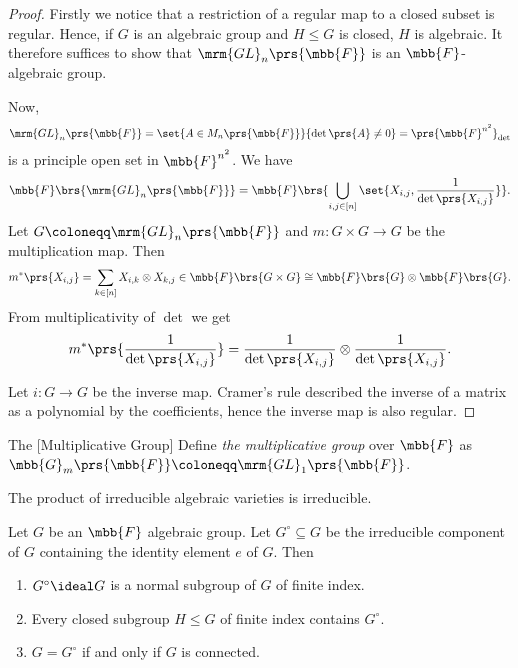 \documentclass[10pt,a4paper,twoside,openany,hidelinks]{book}
\begin{document}
\begin{proof}
Firstly we notice that a restriction of a regular map to a closed subset is regular. Hence, if $G$ is an algebraic group and $H \leq G$ is closed, $H$ is algebraic.
It therefore suffices to show that $\mrm{GL}_n\prs{\mbb{F}}$ is an $\mbb{F}$-algebraic group.

Now, \[\mrm{GL}_n\prs{\mbb{F}} = \set{A \in M_n\prs{\mbb{F}}}{\det\prs{A} \neq 0} = \prs{\mbb{F}^{n^2}}_{\det}\]
is a principle open set in $\mbb{F}^{n^2}$. We have
\begin{align*}
\mbb{F}\brs{\mrm{GL}_n\prs{\mbb{F}}} = \mbb{F}\brs{\bigcup_{i,j \in [n]} \set{X_{i,j}, \frac{1}{\det\prs{X_{i,j}}}}} \text{.}
\end{align*}
Let $G \coloneqq \mrm{GL}_n\prs{\mbb{F}}$ and $m \colon G \times G \to G$ be the multiplication map.
Then
\begin{align*}
m^*\prs{X_{i,j}} = \sum_{k\in[n]} X_{i,k} \otimes X_{k,j} \in \mbb{F}\brs{G\times G} \cong \mbb{F}\brs{G} \otimes \mbb{F}\brs{G} \text{.}
\end{align*}
From multiplicativity of $\det$ we get
\begin{align*}
m^*\prs{\frac{1}{\det\prs{X_{i,j}}}} = \frac{1}{\det\prs{X_{i,j}}} \otimes \frac{1}{\det\prs{X_{i,j}}} \text{.}
\end{align*}

Let $i \colon G \to G$ be the inverse map. Cramer's rule described the inverse of a matrix as a polynomial by the coefficients, hence the inverse map is also regular.
\end{proof}

\begin{definition}The [Multiplicative Group]
Define \emph{the multiplicative group} over $\mbb{F}$ as $\mbb{G}_m\prs{\mbb{F}} \coloneqq \mrm{GL}_1\prs{\mbb{F}}$.
\end{definition}

\begin{exercise} \label{exercise:irreducible_product}
The product of irreducible algebraic varieties is irreducible.
\end{exercise}

\begin{proposition}
Let $G$ be an $\mbb{F}$ algebraic group. Let $G^\circ \subseteq G$ be the irreducible component of $G$ containing the identity element $e$ of $G$. Then

\begin{enumerate}
\item $G^\circ \ideal G$ is a normal subgroup of $G$ of finite index.

\item Every closed subgroup $H \leq G$ of finite index contains $G^\circ$.

\item $G = G^\circ$ if and only if $G$ is connected. \label{connected_group_component}
\end{enumerate}
\end{proposition}
\end{document}

